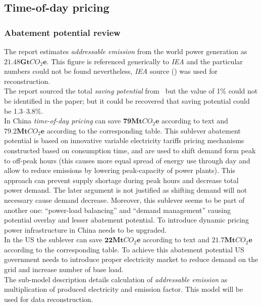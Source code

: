 \documentclass[11pt, twocolumn]{article}
\begin{document}
\subsection{Time-of-day pricing}
\subsubsection{Abatement potential review}
The report estimates \emph{addressable emission} from the world power generation as $\mathbf{21.48Gt}CO_2\mathbf{e}$. This figure is referenced generically to \emph{IEA} and the particular numbers could not be found nevertheless, \emph{IEA} source (\citep{iea2012co2}) was used for reconstruction.\\
The report sourced the total \emph{saving potential} from~\citep{pratt2010smart} but the value of 1\% could not be identified in the paper; but it could be recovered that saving potential could be 1.3--3.8\%.\\

In China \emph{time-of-day pricing} can save $\mathbf{79} \mathbf{Mt}CO_2\mathbf{e}$ according to text and $\mathbf{79.2} \mathbf{Mt}CO_2\mathbf{e}$ according to the corresponding table. This sublever abatement potential is based on innovative variable electricity tariffs pricing mechanisms constructed based on consumption time, and are used to shift demand form peak to off-peak hours (this causes more equal spread of energy use through day and allow to reduce emissions by lowering peak-capacity of power plants). This approach can prevent supply shortage during peak hours and decrease total power demand. The later argument is not justified as shifting demand will not necessary cause demand decrease. Moreover, this sublever seems to be part of another one: ``power-load balancing'' and ``demand management'' causing potential overlay and lesser abatement potential. To introduce dynamic pricing power infrastructure in China needs to be upgraded.\\

In the US the sublever can save $\mathbf{22} \mathbf{Mt}CO_2\mathbf{e}$ according to text and $\mathbf{21.7} \mathbf{Mt}CO_2\mathbf{e}$ according to the corresponding table. To achieve this abatement potential US government needs to introduce proper electricity market to reduce demand on the grid and increase number of base load.\\
The sub-model description details calculation of \emph{addressable emission} as multiplication of produced electricity and emission factor. This model will be used for data reconstruction.\\
\end{document}
